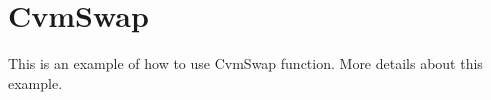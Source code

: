 \hypertarget{_cvm_swap-example}{\section{Cvm\-Swap}
}
This is an example of how to use Cvm\-Swap function. More details about this example.


\begin{DoxyCodeInclude}
\end{DoxyCodeInclude}
 